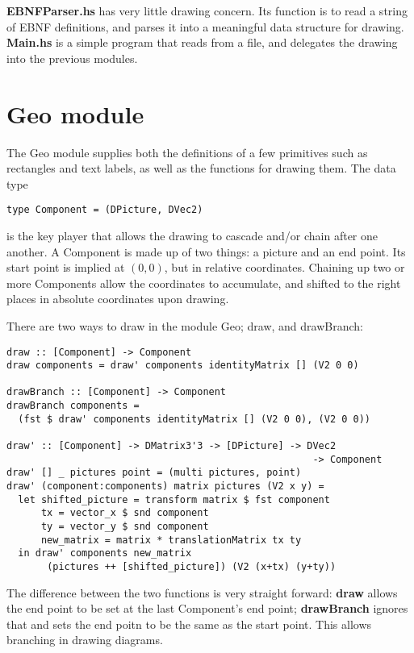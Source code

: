 \documentclass[a4paper]{article}
\begin{document}
\textbf{EBNFParser.hs} has very little drawing concern. Its function is to read a string of EBNF
definitions, and parses it into a meaningful data structure for drawing. \textbf{Main.hs} is a
simple program that reads from a file, and delegates the drawing into the previous modules.

\section{Geo module}
The Geo module supplies both the definitions of a few primitives such as rectangles and text labels, as well as the functions for drawing them. The data type

\begin{verbatim}
type Component = (DPicture, DVec2)
\end{verbatim}

is the key player that allows the drawing to cascade and/or chain after one another. A Component is made up of two things: a picture and an end point. Its start point is implied at $(0, 0)$, but in relative coordinates. Chaining up two or more Components allow the coordinates to accumulate, and shifted to the right places in absolute coordinates upon drawing.

There are two ways to draw in the module Geo; draw, and drawBranch:

\begin{verbatim}
draw :: [Component] -> Component
draw components = draw' components identityMatrix [] (V2 0 0)

drawBranch :: [Component] -> Component
drawBranch components =
  (fst $ draw' components identityMatrix [] (V2 0 0), (V2 0 0))

draw' :: [Component] -> DMatrix3'3 -> [DPicture] -> DVec2
                                                     -> Component
draw' [] _ pictures point = (multi pictures, point)
draw' (component:components) matrix pictures (V2 x y) = 
  let shifted_picture = transform matrix $ fst component
      tx = vector_x $ snd component
      ty = vector_y $ snd component
      new_matrix = matrix * translationMatrix tx ty
  in draw' components new_matrix 
       (pictures ++ [shifted_picture]) (V2 (x+tx) (y+ty))
\end{verbatim}

The difference between the two functions is very straight forward: \textbf{draw} allows the end point to be set at the last Component's end point; \textbf{drawBranch} ignores that and sets the end poitn to be the same as the start point. This allows branching in drawing diagrams.
\end{document}
